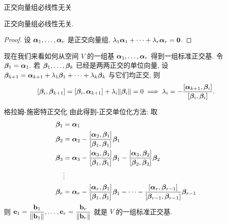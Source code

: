 \begin{frame}{正交向量组必线性无关}
	\onslide<+->
	\begin{theorem}
		正交向量组必线性无关.
	\end{theorem}
	\onslide<+->
	\begin{proof}
		设 $\bma_1,\dots,\bma_r$ 是正交向量组,
		$\lambda_1\bma_1+\cdots+\lambda_r\bma_r={\bf0}$.
		\onslide<+->{%
			故 $\bma_1,\dots,\bma_r$ 线性无关.\qedhere
		}
	\end{proof}
	
	\onslide<+->
	现在我们来看如何从空间 $V$ 的一组基 $\bma_1,\dots,\bma_r$ 得到一组标准正交基.
	\onslide<+->
	令 $\bmb_1=\bma_1$.
	\onslide<+->
	若 $\bmb_1,\dots,\bmb_k$ 已经是两两正交的单位向量, 设 $\bmb_{k+1}=\bma_{k+1}+\lambda_1\bmb_1+\dots+\lambda_k\bmb_k$ 与它们均正交, 
	\onslide<+->
	则
	\[[\bmb_i,\bmb_{k+1}]=[\bmb_i,\bma_{k+1}]+\lambda_i\|\bmb_i\|=0\implies\lambda_i=-\frac{[\bma_{k+1},\bmb_i]}{[\bmb_i,\bmb_i]}.\]
\end{frame}


\begin{frame}{格拉姆-施密特正交化}
	\onslide<+->
	由此得到\alert{-正交单位化方法:} 取
		\begin{align*}
			\bmb_1&=\bma_1\\
			\bmb_2&=\bma_2-\frac{[\bma_2,\bmb_1]}{[\bmb_1,\bmb_1]}\bmb_1\\
			\bmb_3&=\bma_3-\frac{[\bma_3,\bmb_1]}{[\bmb_1,\bmb_1]}\bmb_1-\frac{[\bma_3,\bmb_2]}{[\bmb_2,\bmb_2]}\bmb_2\\
			&\vdots\\
			\bmb_r&=\bma_r-\frac{[\bma_r,\bmb_1]}{[\bmb_1,\bmb_1]}\bmb_1-\cdots-\frac{[\bma_r,\bmb_{r-1}]}{[\bmb_{r-1},\bmb_{r-1}]}\bmb_{r-1}
		\end{align*}
	\onslide<+->
	则 $\bfe_1=\dfrac{\bfb_1}{\|\bfb_1\|},\dots,\bfe_r=\dfrac{\bfb_r}{\|\bfb_r\|}$ 就是 $V$ 的一组标准正交基.
\end{frame}


